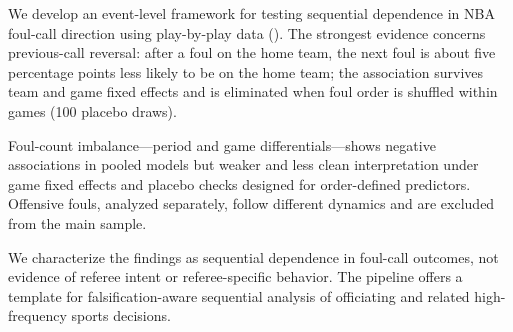 \label{sec:conclusion}

We develop an event-level framework for testing sequential dependence in NBA foul-call direction using play-by-play data (\sampleseasons{}). The strongest evidence concerns previous-call reversal: after a foul on the home team, the next foul is about five percentage points less likely to be on the home team; the association survives team and game fixed effects and is eliminated when foul order is shuffled within games (100 placebo draws).

Foul-count imbalance---period and game differentials---shows negative associations in pooled models but weaker and less clean interpretation under game fixed effects and placebo checks designed for order-defined predictors. Offensive fouls, analyzed separately, follow different dynamics and are excluded from the main sample.

We characterize the findings as sequential dependence in foul-call outcomes, not evidence of referee intent or referee-specific behavior. The pipeline offers a template for falsification-aware sequential analysis of officiating and related high-frequency sports decisions.

